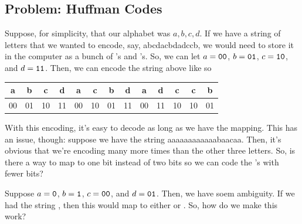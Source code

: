 \documentclass[letterpaper]{article}
\begin{document}
\subsection{Problem: Huffman Codes}
Suppose, for simplicity, that our alphabet was $a, b, c, d$. If we have a string of letters that we wanted to encode, say, abcdacbdadccb, we would need to store it in the computer as a bunch of 's and 's. So, we can let $a = \texttt{00}$, $b = \texttt{01}$, $c = \texttt{10}$, and $d = \texttt{11}$. Then, we can encode the string above like so 
\begin{center}
    \begin{tabular}{c c c c c c c c c c c c c}
        a & b & c & d & a & c & b & d & a & d & c & c & b \\ 
        \hline 
        00 & 01 & 10 & 11 & 00 & 10 & 01 & 11 & 00 & 11 & 10 & 10 & 01 
    \end{tabular}
\end{center}
With this encoding, it's easy to decode as long as we have the mapping. This has an issue, though: suppose we have the string aaaaaaaaaaaabaacaa. Then, it's obvious that we're encoding  many more times than the other three letters. So, is there a way to map  to one bit instead of two bits so we can code the 's with fewer bits? 

\bigskip 

Suppose $a = \texttt{0}$, $b = \texttt{1}$, $c = \texttt{00}$, and $d = \texttt{01}$. Then, we have soem ambiguity. If we had the string , then this would map to either  or . So, how do we make this work?  

\bigskip 
\end{document}
